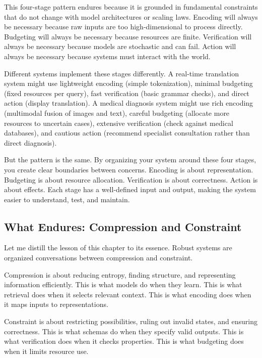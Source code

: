 This four-stage pattern endures because it is grounded in fundamental constraints that do not change with model architectures or scaling laws. Encoding will always be necessary because raw inputs are too high-dimensional to process directly. Budgeting will always be necessary because resources are finite. Verification will always be necessary because models are stochastic and can fail. Action will always be necessary because systems must interact with the world.

Different systems implement these stages differently. A real-time translation system might use lightweight encoding (simple tokenization), minimal budgeting (fixed resources per query), fast verification (basic grammar checks), and direct action (display translation). A medical diagnosis system might use rich encoding (multimodal fusion of images and text), careful budgeting (allocate more resources to uncertain cases), extensive verification (check against medical databases), and cautious action (recommend specialist consultation rather than direct diagnosis).

But the pattern is the same. By organizing your system around these four stages, you create clear boundaries between concerns. Encoding is about representation. Budgeting is about resource allocation. Verification is about correctness. Action is about effects. Each stage has a well-defined input and output, making the system easier to understand, test, and maintain.

\vspace{1em}

\subsection{What Endures: Compression and Constraint}

Let me distill the lesson of this chapter to its essence. Robust systems are organized conversations between compression and constraint.

Compression is about reducing entropy, finding structure, and representing information efficiently. This is what models do when they learn. This is what retrieval does when it selects relevant context. This is what encoding does when it maps inputs to representations.

Constraint is about restricting possibilities, ruling out invalid states, and ensuring correctness. This is what schemas do when they specify valid outputs. This is what verification does when it checks properties. This is what budgeting does when it limits resource use.

